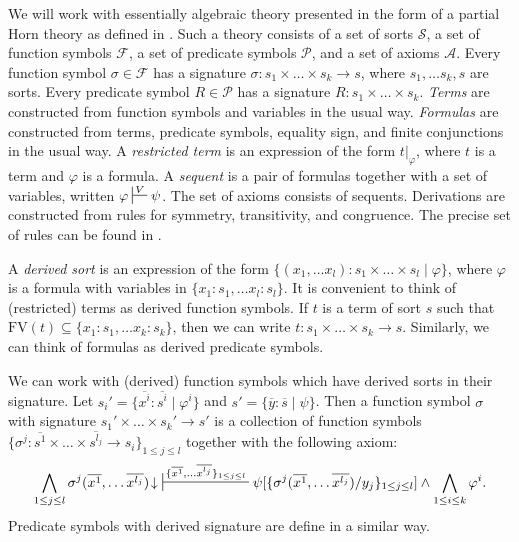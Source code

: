 \documentclass[reqno]{amsart}
\theoremstyle{definition}
\theoremstyle{remark}
\newcommand{\fs}[1]{\mathrm{#1}}
\numberwithin{figure}{section}
\begin{document}
We will work with essentially algebraic theory presented in the form of a partial Horn theory as defined in \cite{PHL}.
Such a theory consists of a set of sorts $\mathcal{S}$, a set of function symbols $\mathcal{F}$, a set of predicate symbols $\mathcal{P}$, and a set of axioms $\mathcal{A}$.
Every function symbol $\sigma \in \mathcal{F}$ has a signature $\sigma : s_1 \times \ldots \times s_k \to s$, where $s_1, \ldots s_k, s$ are sorts.
Every predicate symbol $R \in \mathcal{P}$ has a signature $R : s_1 \times \ldots \times s_k$.
\emph{Terms} are constructed from function symbols and variables in the usual way.
\emph{Formulas} are constructed from terms, predicate symbols, equality sign, and finite conjunctions in the usual way.
A \emph{restricted term} is an expression of the form $t|_\varphi$, where $t$ is a term and $\varphi$ is a formula.
A \emph{sequent} is a pair of formulas together with a set of variables, written $\varphi \sststile{}{V} \psi$.
The set of axioms consists of sequents.
Derivations are constructed from rules for symmetry, transitivity, and congruence.
The precise set of rules can be found in \cite{PHL,alg-tt,morita-equiv}.

A \emph{derived sort} is an expression of the form $\{ (x_1, \ldots x_l) : s_1 \times \ldots \times s_l \mid \varphi \}$,
where $\varphi$ is a formula with variables in $\{ x_1 : s_1, \ldots x_l : s_l \}$.
It is convenient to think of (restricted) terms as derived function symbols.
If $t$ is a term of sort $s$ such that $\fs{FV}(t) \subseteq \{ x_1 : s_1, \ldots x_k : s_k \}$, then we can write $t : s_1 \times \ldots \times s_k \to s$.
Similarly, we can think of formulas as derived predicate symbols.

We can work with (derived) function symbols which have derived sorts in their signature.
Let $s_i' = \{ \overline{x^i} : \overline{s^i} \mid \varphi^i \}$ and $s' = \{ \overline{y} : \overline{s} \mid \psi \}$.
Then a function symbol $\sigma$ with signature $s_1' \times \ldots \times s_k' \to s'$ is a collection of function symbols
$\{ \sigma^j : \overline{s^1} \times \ldots \times \overline{s^{l_j}} \to s_i \}_{1 \leq j \leq l}$ together with the following axiom:
\[ \bigwedge_{1 \leq j \leq l} \sigma^j(\overline{x^1}, \ldots \overline{x^{l_j}})\!\downarrow\ \sststile{}{\{ \overline{x^1}, \ldots \overline{x^{l_j}} \}_{1 \leq j \leq l}} \psi[\{ \sigma^j(\overline{x^1}, \ldots \overline{x^{l_j}})/y_j \}_{1 \leq j \leq l}] \land \bigwedge_{1 \leq i \leq k} \varphi^i. \]
Predicate symbols with derived signature are define in a similar way.
\end{document}
